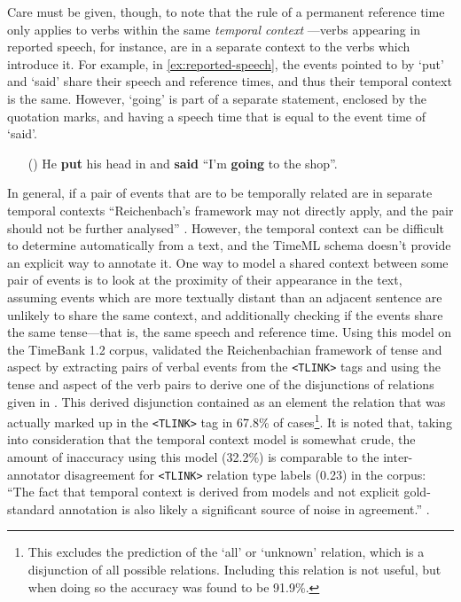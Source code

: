 \documentclass[a4paper,12pt,leqno]{article}
\newcommand{\ipp}{(\refstepcounter{equation}\theequation)}
\begin{document}
Care must be given, though, to note that the rule of a permanent reference time only applies to verbs within the same \textit{temporal context} \citep{hornstein1990time,Derczynski2013}---verbs appearing in reported speech, for instance, are in a separate context to the verbs which introduce it. For example, in \cref{ex:reported-speech}, the events pointed to by `put' and `said' share their speech and reference times, and thus their temporal context is the same. However, `going' is part of a separate statement, enclosed by the quotation marks, and having a speech time that is equal to the event time of `said'.

\begin{itemize}
	\item[\ipp\label{ex:reported-speech}] He \textbf{put} his head in and \textbf{said} ``I'm \textbf{going} to the shop''.
\end{itemize}
In general, if a pair of events that are to be temporally related are in separate temporal contexts ``Reichenbach's framework may not directly apply, and the pair should not be further analysed'' \citep[p. 75]{Derczynski2013}. However, the temporal context can be difficult to determine automatically from a text, and the TimeML schema doesn't provide an explicit way to annotate it. One way to model a shared context between some pair of events is to look at the proximity of their appearance in the text, assuming events which are more textually distant than an adjacent sentence are unlikely to share the same context, and additionally checking if the events share the same tense---that is, the same speech and reference time. Using this model on the TimeBank 1.2 \citep{pustejovsky2006timebank} corpus, \citet[p. 80]{Derczynski2013} validated the Reichenbachian framework of tense and aspect by extracting pairs of verbal events from the \verb|<TLINK>| tags and using the tense and aspect of the verb pairs to derive one of the disjunctions of relations given in . This derived disjunction contained as an element the relation that was actually marked up in the \verb|<TLINK>| tag in 67.8\% of cases\footnote{This excludes the prediction of the `all' or `unknown' relation, which is a disjunction of all possible relations. Including this relation is not useful, but when doing so the accuracy was found to be 91.9\%.}. It is noted that, taking into consideration that the temporal context model is somewhat crude, the amount of inaccuracy using this model (32.2\%) is comparable to the inter-annotator disagreement for \verb|<TLINK>| relation type labels (0.23) in the corpus: ``The fact that temporal context is derived from models and not explicit gold-standard annotation is also likely a significant source of noise in agreement.'' \citep[p. 80]{Derczynski2013}.
\end{document}
